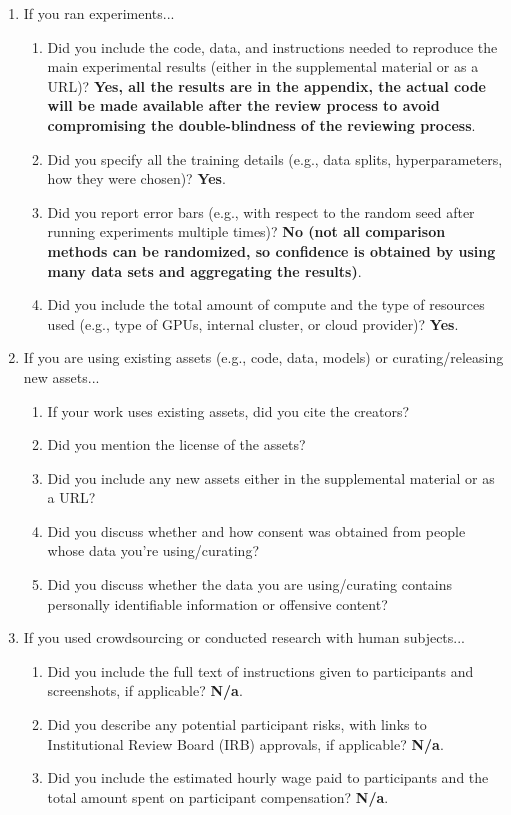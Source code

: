 \documentclass{article}
\begin{document}
\begin{enumerate}
\item If you ran experiments...
\begin{enumerate}
  \item Did you include the code, data, and instructions needed to reproduce the main experimental results (either in the supplemental material or as a URL)?
		\textbf{Yes, all the results are in the appendix, the actual code will be made available after the review process to avoid compromising the double-blindness of the reviewing process}.
  \item Did you specify all the training details (e.g., data splits, hyperparameters, how they were chosen)?
		\textbf{Yes}.
	\item Did you report error bars (e.g., with respect to the random seed after running experiments multiple times)?
    \textbf{No (not all comparison methods can be randomized, so confidence is obtained by using many data sets and aggregating the results)}.
	\item Did you include the total amount of compute and the type of resources used (e.g., type of GPUs, internal cluster, or cloud provider)?
		\textbf{Yes}.
\end{enumerate}

\item If you are using existing assets (e.g., code, data, models) or curating/releasing new assets...
\begin{enumerate}
  \item If your work uses existing assets, did you cite the creators?
    \answerTODO{}
  \item Did you mention the license of the assets?
    \answerTODO{}
  \item Did you include any new assets either in the supplemental material or as a URL?
    \answerTODO{}
  \item Did you discuss whether and how consent was obtained from people whose data you're using/curating?
    \answerTODO{}
  \item Did you discuss whether the data you are using/curating contains personally identifiable information or offensive content?
    \answerTODO{}
\end{enumerate}

\item If you used crowdsourcing or conducted research with human subjects...
\begin{enumerate}
  \item Did you include the full text of instructions given to participants and screenshots, if applicable?
		\textbf{N/a}.
  \item Did you describe any potential participant risks, with links to Institutional Review Board (IRB) approvals, if applicable?
		\textbf{N/a}.
  \item Did you include the estimated hourly wage paid to participants and the total amount spent on participant compensation?
		\textbf{N/a}.
\end{enumerate}

\end{enumerate}
\end{document}

